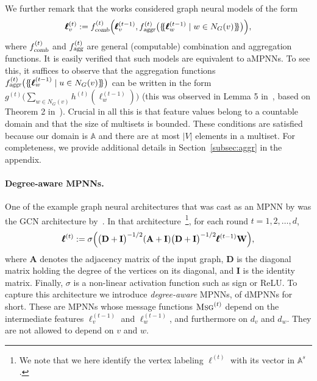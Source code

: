 \documentclass[10pt,a4paper]{article}
\theoremstyle{definition}
\newcommand*{\lmset}{\{\mskip-5mu\{}
\newcommand*{\rmset}{\}\mskip-5mu\}}
\begin{document}
We further remark that the works \citep{XuHLJ19,grohewl}  considered graph neural models of the form
$$
\pmb{\ell}^{(t)}_{v}:=
f_{\textsl{comb}}^{(t)}\Bigl(
\pmb{\ell}_{v}^{(t-1)},f_{\textsl{aggr}}^{(t)}\bigl(\lmset \pmb{\ell}^{(t-1)}_{w} \mid w \in N_G(v) \rmset\bigr)
\Bigr),
$$
where $f_{\textsl{comb}}^{(t)}$ and  $f_{\textsl{agg}}^{(t)}$ are general (computable) combination and aggregation functions. It is easily verified that such models are equivalent to aMPNNs. To see this, it suffices to observe that the aggregation functions $f_{\textsl{aggr}}^{(t)}\bigl(\lmset \pmb{\ell}^{(t-1)}_{w} \mid u \in N_G(v) \rmset\bigr)$ can be written in the form $g^{(t)}\bigl(\sum_{w\in N_G(v)} h^{(t)}(\pmb{\ell}^{(t-1)}_{w})\bigr)$ (this was observed in Lemma 5 in~\citep{XuHLJ19}, based on Theorem 2 in~\citep{ZaheerKRPSS17}). Crucial in all this is that feature values belong to a countable domain and that the size of multisets is bounded. These conditions are satisfied because our domain is $\mathbb{A}$ and there are at most $|V|$ elements in a multiset. For completeness, we provide additional details in Section~\ref{subsec:aggr} in the appendix.



\paragraph{Degree-aware MPNNs.} 
One of the example graph neural architectures that was cast as an MPNN by \citet{GilmerSRVD17}
was the GCN architecture by~\citet{KipfW16}. In that architecture~\footnote{We note that we here identify the vertex labeling $\pmb{\ell}^{(t)}$ with its vector in $\mathbb{A}^s$.}, for each round $t=1,2,\ldots,d$,
\begin{equation}
\pmb{\ell}^{(t)}:=\sigma\Bigl(\bigl(\mathbf{D}+\mathbf{I}\bigr)^{-1/2} (\mathbf{A}+\mathbf{I})\bigl(\mathbf{D}+\mathbf{I}\bigr)^{-1/2} \pmb{\ell}^{(t-1)}\mathbf{W}\Bigr), \label{GNN:Kipf}
\end{equation}
where $\mathbf{A}$ denotes the adjacency matrix of the input graph, $\mathbf{D}$ is the diagonal matrix holding the degree of the vertices on its diagonal, and $\mathbf{I}$ is the identity matrix. Finally, $\sigma$ is a non-linear activation function such as sign or ReLU. To capture this architecture we  introduce \textit{degree-aware} MPNNs, of dMPNNs for short. These are MPNNs
whose message functions $\textsc{Msg}^{(t)}$ depend on the intermediate features $\pmb{\ell}^{(t-1)}_v$ and $\pmb{\ell}^{(t-1)}_w$, and furthermore on $d_v$ and $d_w$. They are not allowed to depend on  $v$ and $w$.
\end{document}
